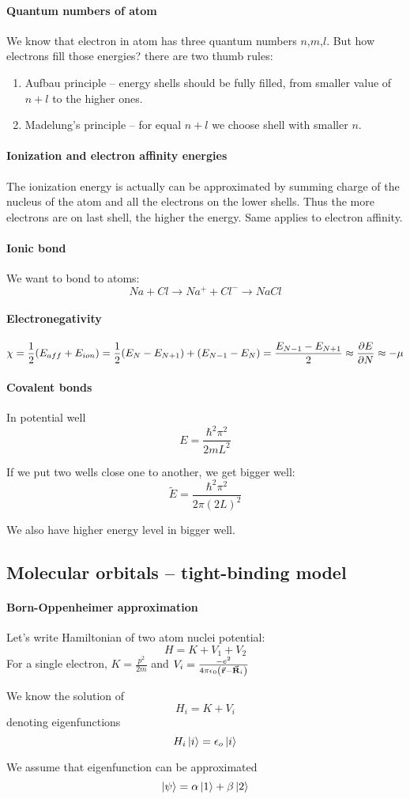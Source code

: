 \paragraph{Quantum numbers of atom}
We know that electron in atom has three quantum numbers $n$,$m$,$l$. But how electrons fill those energies? there are two thumb rules:
\begin{enumerate}
	\item Aufbau principle -- energy shells should be fully filled, from smaller value of $n+l$ to the higher ones.
	\item Madelung's principle -- for equal $n+l$ we choose shell with smaller $n$.
\end{enumerate}

\paragraph{Ionization and electron affinity energies}
The ionization energy is actually can be approximated by summing charge of the nucleus of the atom and all the electrons on the lower shells. Thus the more electrons are on last shell, the higher the energy. Same applies to electron affinity.

\paragraph{Ionic bond}
We want to bond to atoms:
$$Na+Cl \to Na^++Cl^- \to NaCl$$
\paragraph{Electronegativity}
$$\chi = \frac{1}{2} \qty(E_{aff} + E_{ion}) = \frac{1}{2} \qty(E_N - E_{N+1}) + \qty(E_{N-1} - E_N) = \frac{E_{N-1}-E_{N+1}}{2} \approx \pdv{E}{N} \approx -\mu$$

\paragraph{Covalent bonds}
In potential well
$$E=\frac{\hbar^2\pi^2}{2mL^2}$$

If we put two wells close one to another, we get bigger well:
$$\tilde{E} = \frac{\hbar^2 \pi^2}{2\pi(2L)^2}$$

We also have higher energy level in bigger well.
\subsection{Molecular orbitals -- tight-binding model}
\paragraph{Born-Oppenheimer approximation}
Let's write Hamiltonian of two atom nuclei potential:
$$H = K+V_1+V_2$$
For a single electron, $K=\frac{p^2}{2m}$ and
$V_i = \frac{-e^2}{4\pi\epsilon_0\qty(\va{r}-\va{R}_i)}$

We know the solution of
$$H_i = K+V_i$$
denoting eigenfunctions
$$H_i\ket{i} = \epsilon_o \ket{i}$$

We assume that eigenfunction can be approximated
$$\ket{\psi} = \alpha \ket{1} + \beta\ket{2}$$